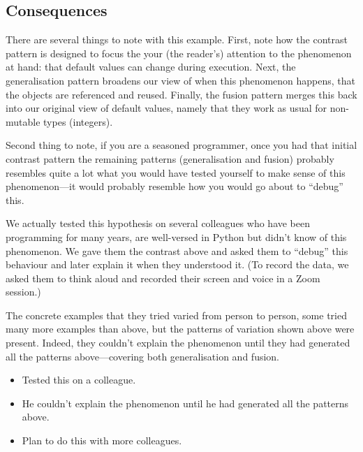 \subsection{Consequences}

There are several things to note with this example.
First, note how the contrast pattern is designed to focus the your (the 
reader's) attention to the phenomenon at hand: that default values can change 
during execution.
Next, the generalisation pattern broadens our view of when this phenomenon 
happens, that the objects are referenced and reused.
Finally, the fusion pattern merges this back into our original view of default 
values, namely that they work as usual for non-mutable types (\eg integers).

Second thing to note, if you are a seasoned programmer, once you had that 
initial contrast pattern the remaining patterns (generalisation and fusion) 
probably resembles quite a lot what you would have tested yourself to make 
sense of this phenomenon---it would probably resemble how you would go about to 
\enquote{debug} this.

We actually tested this hypothesis on several colleagues who have been 
programming for many years, are well-versed in Python but didn't know of this 
phenomenon.
We gave them the contrast above and asked them to \enquote{debug} this 
behaviour and later explain it when they understood it.
(To record the data, we asked them to think aloud and recorded their screen and 
voice in a Zoom session.)

The concrete examples that they tried varied from person to person, some tried 
many more examples than above, but the patterns of variation shown above were 
present.
Indeed, they couldn't explain the phenomenon until they had generated all the 
patterns above---covering both generalisation and fusion.

\begin{frame}
  \begin{remark}[Tested]
    \begin{itemize}
      \item Tested this on a colleague.
      \item He couldn't explain the phenomenon until he had generated all the 
        patterns above.
      \item Plan to do this with more colleagues.
    \end{itemize}
  \end{remark}
\end{frame}

